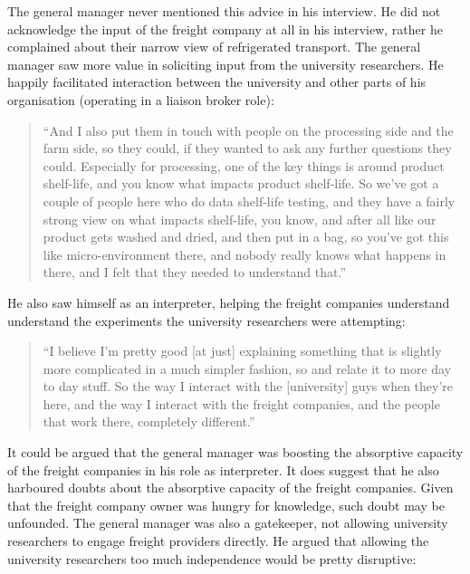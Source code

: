 The general manager never mentioned this advice in his interview. He did not acknowledge the input of the freight company at all in his interview, rather he complained about their narrow view of refrigerated transport. The general manager saw more value in soliciting input from the university researchers. He happily facilitated interaction between the university and other parts of his organisation (operating in a liaison broker role):

\begin{quote}
\small
\enquote{And I also put them in touch with people on the processing side and the farm side, so they could, if they wanted to ask any further questions they could. Especially for processing, one of the key things is around product shelf-life, and you know what impacts product shelf-life. So we've got a couple of people here who do data shelf-life testing, and they have a fairly strong view on what impacts shelf-life, you know, and after all like our product gets washed and dried, and then put in a bag, so you've got this like micro-environment there, and nobody really knows what happens in there, and I felt that they needed to understand that.} \\
\end{quote}

He also saw himself as an interpreter, helping the freight companies understand understand the experiments the university researchers were attempting: 

\begin{quote}
\small
\enquote{I believe I'm pretty good [at just] explaining something that is slightly more complicated in a much simpler fashion, so and relate it to more day to day stuff. So the way I interact with the [university] guys when they're here, and the way I interact with the freight companies, and the people that work there, completely different.} \\
\end{quote}

It could be argued that the general manager was boosting the absorptive capacity of the freight companies in his role as interpreter. It does suggest that he also harboured doubts about the absorptive capacity of the freight companies. Given that the freight company owner was hungry for knowledge, such doubt may be unfounded. The general manager was also a gatekeeper, not allowing university researchers to engage freight providers directly. He argued that allowing the university researchers too much independence would be pretty disruptive: 

